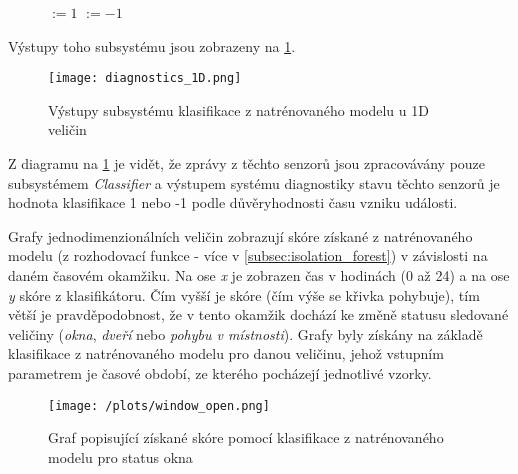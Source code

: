 \begin{figure}[ht]
  \centering
  \begin{minipage}{0.4\linewidth}
		\begin{algorithmic}
			 \STATE {}$:= 1$ \ELSE \STATE {}$:= -1$  \ENDIF
		\end{algorithmic}
  \end{minipage}
\end{figure}

Výstupy toho subsystému jsou zobrazeny na \cref{fig:diagnostics_1D}.

\begin{figure}[H]
  \centering
  \texttt{[image: diagnostics\_1D.png]}
  \caption{Výstupy subsystému klasifikace z natrénovaného modelu u 1D veličin}
  \label{fig:diagnostics_1D}
\end{figure}  

Z diagramu na \cref{fig:diagnostics_1D} je vidět, že zprávy z těchto senzorů jsou zpracovávány pouze subsystémem \textit{Classifier} a výstupem systému diagnostiky stavu těchto senzorů je hodnota klasifikace 1 nebo -1 podle důvěryhodnosti času vzniku události. \par
Grafy jednodimenzionálních veličin zobrazují skóre získané z natrénovaného modelu (z rozhodovací funkce - více v \cref{subsec:isolation_forest}) v závislosti na daném časovém okamžiku. Na ose \textit{x} je zobrazen čas v hodinách (0 až 24) a na ose \textit{y} skóre z klasifikátoru. Čím vyšší je skóre (čím výše se křivka pohybuje), tím větší je pravděpodobnost, že v tento okamžik dochází ke změně statusu sledované veličiny (\textit{okna}, \textit{dveří} nebo \textit{pohybu v místnosti}). Grafy byly získány na základě klasifikace z natrénovaného modelu pro danou veličinu, jehož vstupním parametrem je časové období, ze kterého pocházejí jednotlivé vzorky. 

\begin{figure}[H]
  \centering
  \texttt{[image: /plots/window\_open.png]}
  \caption{Graf popisující získané skóre pomocí klasifikace z natrénovaného modelu pro status okna}
  \label{fig:1D_window_open}
\end{figure}

